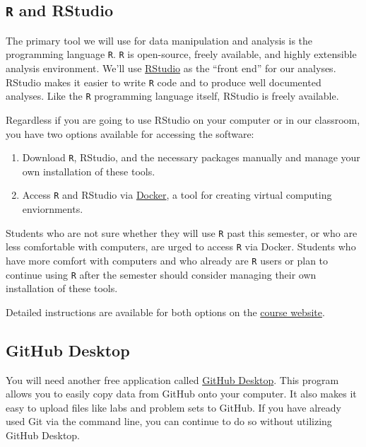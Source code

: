 \documentclass[]{book}
\providecommand{\tightlist}{%
  \setlength{\itemsep}{0pt}\setlength{\parskip}{0pt}}
\theoremstyle{definition}
\theoremstyle{definition}
\theoremstyle{definition}
\theoremstyle{remark}
\begin{document}
\subsection{\texorpdfstring{\texttt{R} and
RStudio}{R and RStudio}}\label{r-and-rstudio}

The primary tool we will use for data manipulation and analysis is the
programming language \texttt{R}. \texttt{R} is open-source, freely
available, and highly extensible analysis environment. We'll use
\href{https://www.rstudio.com}{RStudio} as the ``front end'' for our
analyses. RStudio makes it easier to write \texttt{R} code and to
produce well documented analyses. Like the \texttt{R} programming
language itself, RStudio is freely available.

Regardless if you are going to use RStudio on your computer or in our
classroom, you have two options available for accessing the software:

\begin{enumerate}
\def\labelenumi{\arabic{enumi}.}
\tightlist
\item
  Download \texttt{R}, RStudio, and the necessary packages manually and
  manage your own installation of these tools.
\item
  Access \texttt{R} and RStudio via
  \href{https://www.docker.com}{Docker}, a tool for creating virtual
  computing enviornments.
\end{enumerate}

Students who are not sure whether they will use \texttt{R} past this
semester, or who are less comfortable with computers, are urged to
access \texttt{R} via Docker. Students who have more comfort with
computers and who already are \texttt{R} users or plan to continue using
\texttt{R} after the semester should consider managing their own
installation of these tools.

Detailed instructions are available for both options on the
\href{https://slu-soc5050.github.io/course-software/}{course website}.

\subsection{GitHub Desktop}\label{github-desktop}

You will need another free application called
\href{https://desktop.github.com}{GitHub Desktop}. This program allows
you to easily copy data from GitHub onto your computer. It also makes it
easy to upload files like labs and problem sets to GitHub. If you have
already used Git via the command line, you can continue to do so without
utilizing GitHub Desktop.
\end{document}
